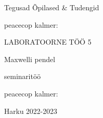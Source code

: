\begin{titlepage}
\par{Tegusad Õpilased \& Tudengid}
\vspace{0.3\textheight}
\par{peacecop kalmer:}
\LARGE
\par{LABORATOORNE TÖÖ 5}
\par{Maxwelli pendel}
\normalsize
\par{seminaritöö}
\vspace{0.3\textheight}
\begin{flushright}
\par{peacecop kalmer:}
\end{flushright}
\vfill
Harku
\hfill
2022-2023
\end{titlepage}
